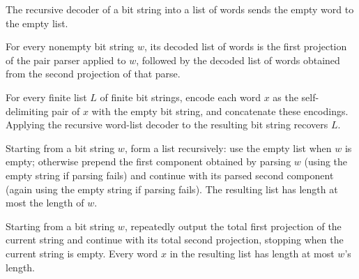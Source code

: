 \begin{theorem}
\label{Complexity.BinArith.decWords_nil}
\leanok
{}
The recursive decoder of a bit string into a list of words sends the empty word to the
empty list.
\end{theorem}

\begin{theorem}
\label{Complexity.BinArith.decWords_of_ne}
\leanok
{}
For every nonempty bit string $w$, its decoded list of words is the first projection of
the pair parser applied to $w$, followed by the decoded list of words obtained from the
second projection of that parse.
\end{theorem}

\begin{theorem}
\label{Complexity.BinArith.decWords_encWords}
\leanok
{}
For every finite list $L$ of finite bit strings, encode each word $x$ as the
self-delimiting pair of $x$ with the empty bit string, and concatenate these encodings.
Applying the recursive word-list decoder to the resulting bit string recovers $L$.
\end{theorem}

\begin{theorem}
\label{Complexity.BinArith.length_decWords_le}
\leanok
{}
Starting from a bit string $w$, form a list recursively: use the empty list when $w$ is
empty; otherwise prepend the first component obtained by parsing $w$ (using the empty
string if parsing fails) and continue with its parsed second component (again using the
empty string if parsing fails). The resulting list has length at most the length of $w$.
\end{theorem}

\begin{theorem}
\label{Complexity.BinArith.length_le_of_mem_decWords}
\leanok
{}
Starting from a bit string $w$, repeatedly output the total first projection of the
current string and continue with its total second projection, stopping when the current
string is empty. Every word $x$ in the resulting list has length at most $w$'s length.
\end{theorem}

